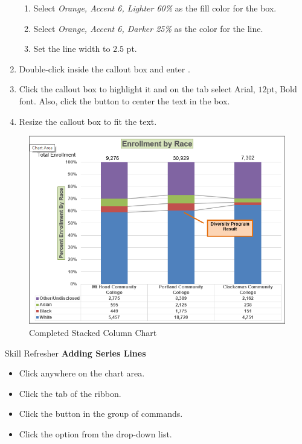\begin{enumerate}
	\begin{enumerate}
		\item Select \textit{Orange, Accent 6, Lighter 60\%} as the fill color for the box.
		\item Select \textit{Orange, Accent 6, Darker 25\%} as the color for the line.
		\item Set the line width to $ 2.5 $ pt.
	\end{enumerate}
	
	\item Double-click inside the callout box and enter .
	\item Click the callout box to highlight it and on the  tab select Arial, $ 12 $pt, Bold font. Also, click the  button to center the text in the box.
	\item Resize the callout box to fit the text.
	
\end{enumerate}

\begin{figure}[H]
	\centering
	\includegraphics[width=\maxwidth{.95\linewidth}]{gfx/ch04_fig42}
	\caption{Completed Stacked Column Chart}
	\label{04:fig42}
\end{figure}

\begin{center}
	\begin{sklbox}{Skill Refresher}
		\textbf{Adding Series Lines}
		\\
		\begin{itemize}
			\setlength{\itemsep}{0pt}
			\setlength{\parskip}{0pt}
			\setlength{\parsep}{0pt}
			
			\item Click anywhere on the chart area.
			\item Click the  tab of the ribbon.
			\item Click the  button in the  group of commands.
			\item Click the  option from the drop-down list.
			
		\end{itemize}
	\end{sklbox}
\end{center}

